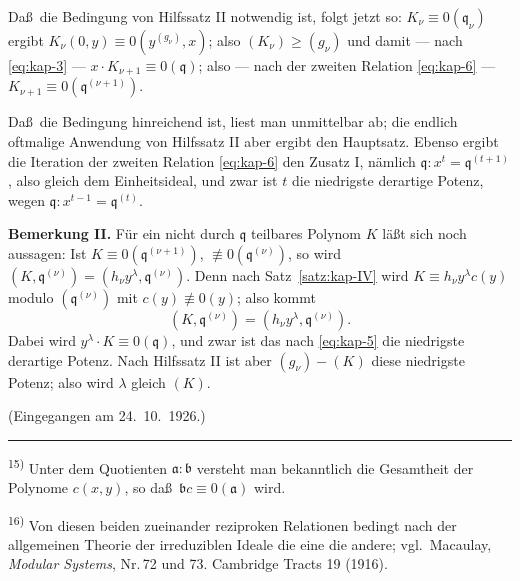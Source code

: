 \documentclass[12pt,a4paper]{article}
\theoremstyle{plain}
\theoremstyle{definition}
\theoremstyle{remark}
\begin{document}
Da\ss\ die Bedingung von Hilfssatz II notwendig ist, folgt jetzt so:
$K_{\nu} \equiv 0(\mathfrak{q}_{\nu})$ ergibt $K_{\nu}(0,y) \equiv 0(y^{(g_{\nu})}, x)$; also
$(K_{\nu}) \geq (g_{\nu})$ und damit --- nach \eqref{eq:kap-3} ---
$x \cdot K_{\nu+1} \equiv 0(\mathfrak{q})$; also --- nach der zweiten Relation
\eqref{eq:kap-6} --- $K_{\nu+1} \equiv 0(\mathfrak{q}^{(\nu+1)})$.

Da\ss\ die Bedingung hinreichend ist, liest man unmittelbar ab; die
endlich oftmalige Anwendung von Hilfssatz II aber ergibt den
Hauptsatz. Ebenso ergibt die Iteration der zweiten Relation
\eqref{eq:kap-6} den Zusatz I, n\"amlich $\mathfrak{q} : x^{t} = \mathfrak{q}^{(t+1)}$,
also gleich dem Einheitsideal, und zwar ist $t$ die niedrigste
derartige Potenz, wegen $\mathfrak{q} : x^{t-1} = \mathfrak{q}^{(t)}$.

\textbf{Bemerkung II.} F\"ur ein nicht durch $\mathfrak{q}$ teilbares Polynom $K$
l\"a\ss t sich noch aussagen: Ist $K \equiv 0(\mathfrak{q}^{(\nu+1)})$,
$\not\equiv 0(\mathfrak{q}^{(\nu)})$, so wird $(K, \mathfrak{q}^{(\nu)}) = (h_{\nu}y^{\lambda}, \mathfrak{q}^{(\nu)})$.
Denn nach Satz~\ref{satz:kap-IV} wird $K \equiv h_{\nu}y^{\lambda}c(y)$ modulo
$(\mathfrak{q}^{(\nu)})$ mit $c(y) \not\equiv 0(y)$; also kommt
\[
(K, \mathfrak{q}^{(\nu)}) = (h_{\nu}y^{\lambda}, \mathfrak{q}^{(\nu)}).
\]
Dabei wird $y^{\lambda} \cdot K \equiv 0(\mathfrak{q})$, und zwar ist das nach
\eqref{eq:kap-5} die niedrigste derartige Potenz. Nach Hilfssatz II
ist aber $(g_{\nu}) - (K)$ diese niedrigste Potenz; also wird
$\lambda$ gleich $(K)$.

\vfill
\begin{flushright}
(Eingegangen am 24.\ 10.\ 1926.)
\end{flushright}

\vspace{0.5em}
\noindent\rule{\textwidth}{0.4pt}
\vspace{0.3em}

{\footnotesize
\textsuperscript{15)} Unter dem Quotienten $\mathfrak{a}:\mathfrak{b}$ versteht man bekanntlich die Gesamtheit der
Polynome $c(x,y)$, so da\ss\ $\mathfrak{b}c \equiv 0(\mathfrak{a})$ wird.

\textsuperscript{16)} Von diesen beiden zueinander reziproken Relationen bedingt nach der allgemeinen
Theorie der irreduziblen Ideale die eine die andere; vgl.\ Macaulay,
\textit{Modular Systems}, Nr.\,72 und 73. Cambridge Tracts 19 (1916).
}


\newpage
\end{document}
